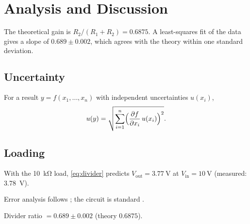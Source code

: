 \section{Analysis and Discussion}

The theoretical gain is $R_2/(R_1+R_2)=\num{0.6875}$. A least-squares fit of the data gives a slope of
$\num{0.689}\pm\num{0.002}$, which agrees with the theory within one standard deviation.

\subsection{Uncertainty}
For a result $y=f(x_1,\dots,x_n)$ with independent uncertainties $u(x_i)$,
\begin{equation}\label{eq:uncertainty}
  u(y)=\sqrt{\sum_{i=1}^{n}\Bigl(\frac{\partial f}{\partial x_i}\,u(x_i)\Bigr)^{2}}.
\end{equation}

\subsection{Loading}
With the \qty{10}{\kilo\ohm} load, \cref{eq:divider} predicts $V_\mathrm{out}=\qty{3.77}{\volt}$ at $V_\mathrm{in}=\qty{10}{\volt}$ (measured: \qty{3.78}{\volt}).

Error analysis follows \cite{taylor1997}; the circuit is standard \cite{horowitz2015}.

\begin{resultbox}[Result]
Divider ratio $=\num{0.689}\pm\num{0.002}$ (theory $\num{0.6875}$).
\end{resultbox}
